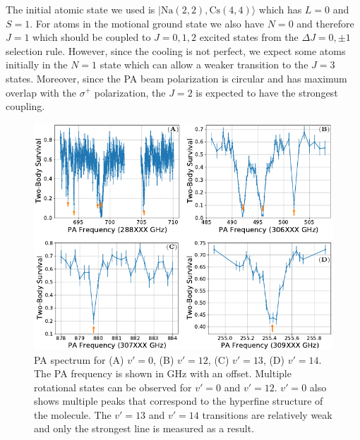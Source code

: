 The initial atomic state we used is $|\mathrm{Na(2, 2),Cs(4, 4)}\rangle$
which has $L=0$ and $S=1$.
For atoms in the motional ground state we also have $N=0$ and therefore $J=1$
which should be coupled to $J=0,1,2$ excited states from the $\Delta J=0,\pm1$ selection rule.
However, since the cooling is not perfect,
we expect some atoms initially in the $N=1$ state which can allow a weaker
transition to the $J=3$ states.
Moreover, since the PA beam polarization is circular
and has maximum overlap with the $\sigma^+$ polarization,
the $J=2$ is expected to have the strongest coupling.

\begin{figure}
  \centering
  \includegraphics[width=\textwidth]{figures/pa_spectrum.pdf}
  \caption[PA spectrum]{
    PA spectrum for (A) $v'=0$, (B) $v'=12$, (C) $v'=13$, (D) $v'=14$.
    The PA frequency is shown in GHz with an offset.
    Multiple rotational states can be observed for $v'=0$ and $v'=12$.
    $v'=0$ also shows multiple peaks that correspond to
    the hyperfine structure of the molecule.
    The $v'=13$ and $v'=14$ transitions are relatively weak
    and only the strongest line is measured as a result.
    \label{fig:pa:spectrum}}
\end{figure}

